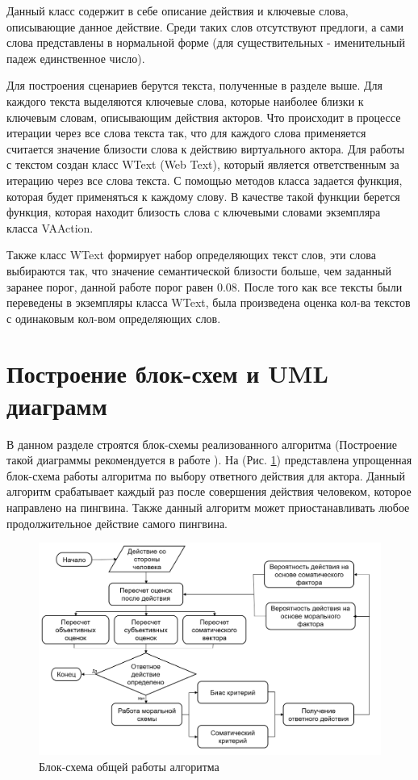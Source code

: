 Данный класс содержит в себе описание действия и ключевые слова, описывающие данное действие. 
Среди таких слов отсутствуют предлоги, а сами слова представлены в нормальной форме 
(для существительных - именительный падеж единственное число).

Для построения сценариев берутся текста, полученные в разделе выше. Для каждого текста выделяются ключевые слова, 
которые наиболее близки к ключевым словам, описывающим действия акторов. Что происходит в процессе итерации через 
все слова текста так, что для каждого слова применяется считается значение близости слова к действию виртуального 
актора. Для работы с текстом создан класс WText (Web Text), который является ответственным за итерацию через все 
слова текста. С помощью методов класса задается функция, которая будет применяться к каждому слову. В качестве 
такой функции берется функция, которая находит близость слова с ключевыми словами экземпляра класса VAAction.

Также класс WText формирует набор определяющих текст слов, эти слова выбираются так, что значение 
семантической близости больше, чем заданный заранее порог, данной работе порог равен 0.08. После 
того как все тексты были переведены в экземпляры класса WText, была произведена оценка кол-ва 
текстов с одинаковым кол-вом определяющих слов.

\section{Построение блок-схем и UML диаграмм}

В данном разделе строятся блок-схемы реализованного алгоритма (Построение такой диаграммы рекомендуется в работе \cite{OOP}).
На (Рис. \ref{pic:oldcmodel0}) представлена упрощенная блок-схема работы алгоритма по выбору ответного действия для актора.
Данный алгоритм срабатывает каждый раз после совершения действия человеком, которое направлено на пингвина.
Также данный алгоритм может приостанавливать любое продолжительное действие самого пингвина. 

\begin{figure}[h]
\includegraphics[width=0.75\columnwidth]{./img/oldcmodel0.png}
\centering
\caption{Блок-схема общей работы алгоритма}
\label{pic:oldcmodel0}
\end{figure}

